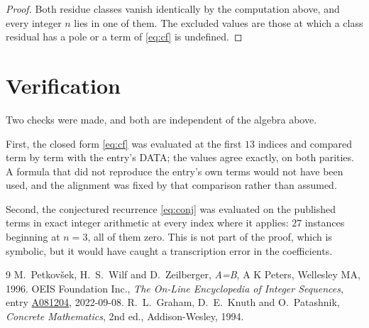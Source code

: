 \documentclass[11pt,a4paper]{article}
\theoremstyle{plain}
\theoremstyle{definition}
\begin{document}
\begin{proof}
Both residue classes vanish identically by the computation above, and every integer $n$
lies in one of them. The excluded values are those at which a class residual has a pole or
a term of \eqref{eq:cf} is undefined.
\end{proof}

\section{Verification}

Two checks were made, and both are independent of the algebra above.

First, the closed form \eqref{eq:cf} was evaluated at the first $13$ indices and
compared term by term with the entry's DATA; the values agree exactly, on both parities. A
formula that did not reproduce the entry's own terms would not have been used, and the
alignment was fixed by that comparison rather than assumed.

Second, the conjectured recurrence \eqref{eq:conj} was evaluated on the published terms in
exact integer arithmetic at every index where it applies: $27$ instances beginning at
$n=3$, all of them zero. This is not part of the proof, which is symbolic, but it
would have caught a transcription error in the coefficients.

\begin{thebibliography}{9}
 M.~Petkov\v{s}ek, H.~S.~Wilf and D.~Zeilberger, \emph{A=B}, A K Peters,
Wellesley MA, 1996.
 OEIS Foundation Inc., \emph{The On-Line Encyclopedia of Integer Sequences},
entry \href{https://oeis.org/A081204}{A081204}, 2022-09-08.
 R.~L.~Graham, D.~E.~Knuth and O.~Patashnik, \emph{Concrete Mathematics},
2nd ed., Addison-Wesley, 1994.
\end{thebibliography}
\end{document}

